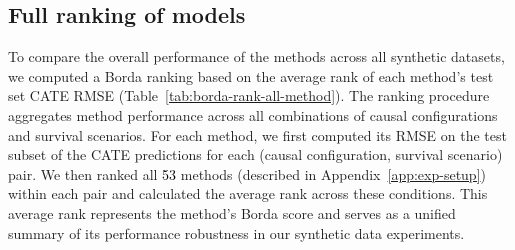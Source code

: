 \documentclass{article} %
\newcommand{\rebuttal}[1]{\textcolor{black}{#1}}
\begin{document}
\subsection{Full ranking of models}
\label{app:full-rankings}

To compare the overall performance of the methods across all synthetic datasets, we computed a Borda ranking based on the average rank of each method’s test set CATE RMSE (Table~\ref{tab:borda-rank-all-method}). The ranking procedure aggregates method performance across all combinations of causal configurations and survival scenarios. For each method, we first computed its RMSE on the test subset of the CATE predictions for each (causal configuration, survival scenario) pair. We then ranked all \rebuttal{53} methods (described in Appendix~\ref{app:exp-setup}) within each pair and calculated the average rank across these conditions. This average rank represents the method’s Borda score and serves as a unified summary of its performance robustness in our synthetic data experiments.
\end{document}
